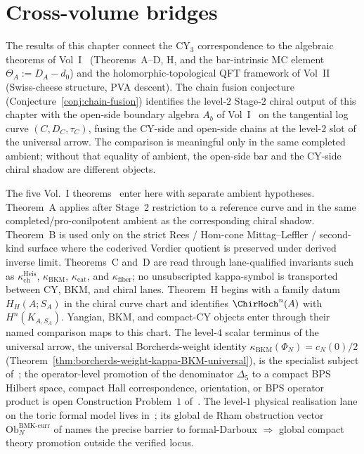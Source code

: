 \section{Cross-volume bridges}
\label{sec:cross-volume}

The results of this chapter connect the CY$_3$ correspondence to the
algebraic theorems of Vol~I~\cite{VolI} (Theorems~A--D, H, and the
bar-intrinsic MC element $\Theta_A := D_A - d_0$) and the
holomorphic-topological QFT framework of Vol~II~\cite{VolII}
(Swiss-cheese structure, PVA descent). The chain fusion conjecture
(Conjecture~\ref{conj:chain-fusion}) identifies the level-$2$
Stage-$2$ chiral output of this chapter with the open-side boundary
algebra $A_b$ of Vol~I~\cite{VolI} on the tangential log curve
$(C, D_C, \tau_C)$, fusing the CY-side and open-side chains at the
level-$2$ slot of the universal arrow. The comparison is meaningful only
in the same completed ambient; without that equality of ambient, the
open-side bar and the CY-side chiral shadow are different objects.

The five Vol.~I theorems~\cite{VolI} enter here with separate ambient
hypotheses. Theorem~A applies after Stage~2 restriction to a
reference curve and in the same completed/pro-conilpotent ambient as
the corresponding chiral shadow. Theorem~B is used only on the strict
Rees / Hom-cone Mittag--Leffler / second-kind surface where the
coderived Verdier quotient is preserved under derived inverse limit.
Theorems~C and~D are read through lane-qualified invariants such as
$\kappa_{\mathrm{ch}}^{\mathrm{Heis}}$, $\kappa_{\mathrm{BKM}}$,
$\kappa_{\mathrm{cat}}$, and $\kappa_{\mathrm{fiber}}$; no
unsubscripted kappa-symbol is transported between CY, BKM, and chiral
lanes.
Theorem~H begins with a family datum $H_H(A;S_A)$ in the chiral curve
chart and identifies $\ChirHoch^n(A)$ with $H^n(K_{A,S_A})$.
Yangian, BKM, and compact-CY objects enter through their named
comparison maps to this chart.  The level-$4$ scalar terminus of the
universal arrow, the universal Borcherds-weight identity
$\kappa_{\mathrm{BKM}}(\Phi_N) = c_N(0)/2$
(Theorem~\ref{thm:borcherds-weight-kappa-BKM-universal}), is the
specialist subject of~\cite{LorgatIgusaCuspForm}; the
operator-level promotion of the denominator $\Delta_5$ to a compact
BPS Hilbert space, compact Hall correspondence, orientation, or BPS
operator product is open Construction Problem~$1$
of~\cite{LorgatIgusaCuspForm}. The level-$1$ physical realisation
lane on the toric formal model lives
in~\cite{LorgatMixedHTStrings}; its global de Rham obstruction
vector $\mathrm{Ob}^{\mathrm{BMK\text{-}curr}}_N$ of
\cite{LorgatMixedHTStrings} names the precise barrier to
formal-Darboux $\Rightarrow$ global compact theory promotion
outside the verified locus.

